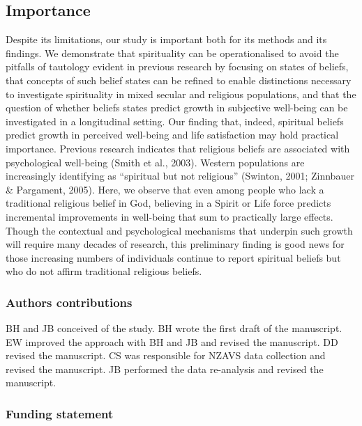 \documentclass[
  english,
  man,floatsintext]{apa6}
\begin{document}
\hypertarget{importance}{%
\subsection{Importance}\label{importance}}

Despite its limitations, our study is important both for its methods and its findings. We demonstrate that spirituality can be operationalised to avoid the pitfalls of tautology evident in previous research by focusing on states of beliefs, that concepts of such belief states can be refined to enable distinctions necessary to investigate spirituality in mixed secular and religious populations, and that the question of whether beliefs states predict growth in subjective well-being can be investigated in a longitudinal setting. Our finding that, indeed, spiritual beliefs predict growth in perceived well-being and life satisfaction may hold practical importance. Previous research indicates that religious beliefs are associated with psychological well-being (Smith et al., 2003). Western populations are increasingly identifying as \enquote{spiritual but not religious} (Swinton, 2001; Zinnbauer \& Pargament, 2005). Here, we observe that even among people who lack a traditional religious belief in God, believing in a Spirit or Life force predicts incremental improvements in well-being that sum to practically large effects. Though the contextual and psychological mechanisms that underpin such growth will require many decades of research, this preliminary finding is good news for those increasing numbers of individuals continue to report spiritual beliefs but who do not affirm traditional religious beliefs.

\hypertarget{authors-contributions}{%
\subsubsection{Authors contributions}\label{authors-contributions}}

BH and JB conceived of the study. BH wrote the first draft of the manuscript. EW improved the approach with BH and JB and revised the manuscript. DD revised the manuscript. CS was responsible for NZAVS data collection and revised the manuscript. JB performed the data re-analysis and revised the manuscript.

\hypertarget{funding-statement}{%
\subsubsection{Funding statement}\label{funding-statement}}
\end{document}
